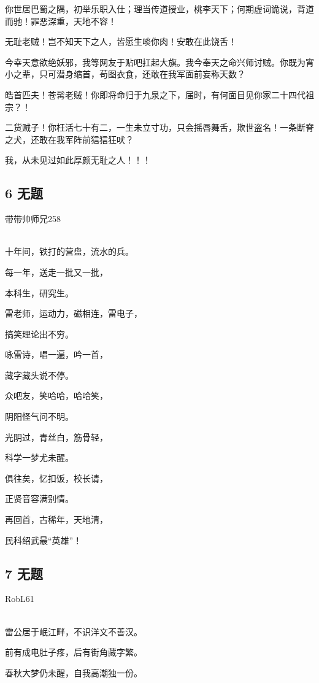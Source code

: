 你世居巴蜀之隅，初举乐职入仕；理当传道授业，桃李天下；何期虚词诡说，背道而驰！罪恶深重，天地不容！

无耻老贼！岂不知天下之人，皆愿生啖你肉！安敢在此饶舌！

今幸天意欲绝妖邪，我等网友于贴吧扛起大旗。我今奉天之命兴师讨贼。你既为宵小之辈，只可潜身缩首，苟图衣食，还敢在我军面前妄称天数？

皓首匹夫！苍髯老贼！你即将命归于九泉之下，届时，有何面目见你家二十四代祖宗？！

二货贼子！你枉活七十有二，一生未立寸功，只会摇唇舞舌，欺世盗名！一条断脊之犬，还敢在我军阵前狺狺狂吠？

我，从未见过如此厚颜无耻之人！！！

\hypertarget{ux65e0ux9898-4}{%
\subsection{6 无题}\label{ux65e0ux9898-4}}

带带帅师兄258

~\\
十年间，铁打的营盘，流水的兵。

每一年，送走一批又一批，

本科生，研究生。

雷老师，运动力，磁相连，雷电子，

搞笑理论出不穷。

咏雷诗，唱一遍，吟一首，

藏字藏头说不停。

众吧友，笑哈哈，哈哈笑，

阴阳怪气问不明。

光阴过，青丝白，筋骨轻，

科学一梦尤未醒。

俱往矣，忆扣饭，校长请，

正贤音容满别情。

再回首，古稀年，天地清，

民科绍武最``英雄''！

\hypertarget{ux65e0ux9898-5}{%
\subsection{7 无题}\label{ux65e0ux9898-5}}

RobL61

~\\
雷公居于岷江畔，不识洋文不善汉。

前有成电肚子疼，后有街角藏字繁。

春秋大梦仍未醒，自我高潮独一份。

